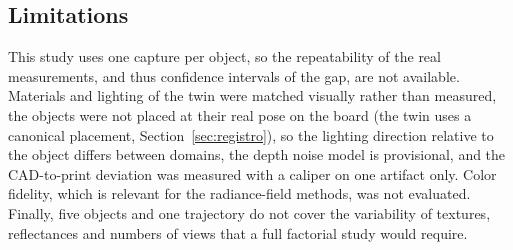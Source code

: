 \subsection{Limitations}
This study uses one capture per object, so the repeatability of the real measurements, and thus confidence
intervals of the gap, are not available. Materials and lighting of the twin were matched visually rather
than measured, the objects were not placed at their real pose on the board (the twin uses a canonical
placement, Section~\ref{sec:registro}), so the lighting direction relative to the object differs between
domains, the depth noise model is provisional, and the CAD-to-print deviation was measured with a
caliper on one artifact only. Color fidelity, which is relevant for the radiance-field methods, was not
evaluated. Finally, five objects and one trajectory do not cover the variability of textures,
reflectances and numbers of views that a full factorial study would require.
